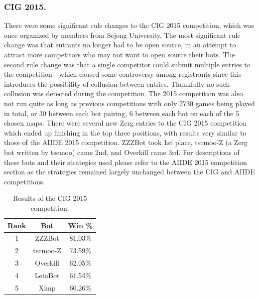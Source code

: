 \documentclass{llncs}
\begin{document}
\subsubsection{CIG 2015.}
There were some significant rule changes to the CIG 2015 competition, which was once organized by members from Sejong University. The most significant rule change was that entrants no longer had to be open source, in an attempt to attract more competitors who may not want to open source their bots. The second rule change was that a single competitor could submit multiple entries to the competition - which caused some controversy among registrants since this introduces the possibility of collusion between entries. Thankfully no such collusion was detected during the competition. The 2015 competition was also not run quite as long as previous competitions with only 2730 games being played in total, or 30 between each bot pairing, 6 between each bot on each of the 5 chosen maps. There were several new Zerg entries to the CIG 2015 competition which ended up finishing in the top three positions, with results very similar to those of the AIIDE 2015 competition. ZZZBot took 1st place, tscmoo-Z (a Zerg bot written by tscmoo) came 2nd, and Overkill came 3rd. For descriptions of these bots and their strategies used please refer to the AIIDE 2015 competition section as the strategies remained largely unchanged between the CIG and AIIDE competitions. 

\begin{table}[t]
\caption{Results of the CIG 2015 competition.}
\label{tab:cig2015}
\centering
\begin{tabular}{|c|c|c|}
\hline
{\bfseries Rank} & {\bfseries Bot} & {\bfseries Win \%} \\
\hline
1 & ZZZBot & 81.03\% \\
2 & tscmoo-Z & 73.59\% \\
3 & Overkill & 62.05\% \\
4 & LetaBot & 61.54\% \\
5 & Ximp & 60.26\% \\ 
\hline
\end{tabular}
\end{table}
\end{document}
